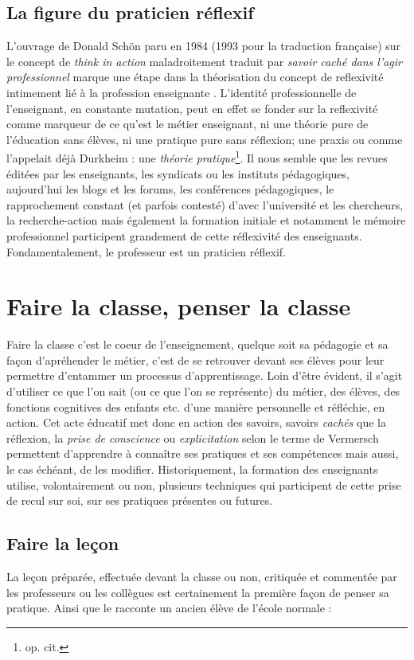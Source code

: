 \documentclass[a4paper,11pt]{article}
\begin{document}
			\subsection{La figure du praticien réflexif}
			L'ouvrage de Donald Schön paru en 1984 (1993 pour la traduction française) sur le concept de \emph{think in action} maladroitement traduit par \emph{savoir caché dans l'agir professionnel} marque une étape dans la théorisation du concept de reflexivité intimement lié à la profession enseignante \cite{sch93}. L'identité professionnelle de l'enseignant, en constante mutation, peut en effet se fonder sur la reflexivité comme marqueur de ce qu'est le métier enseignant, ni une théorie pure de l'éducation sans élèves, ni une pratique pure sans réflexion; une praxis ou comme l'appelait déjà Durkheim : une \emph{théorie pratique}\footnote{op. cit.}. Il nous semble que les revues éditées par les enseignants, les syndicats ou les instituts pédagogiques, aujourd'hui les blogs et les forums, les conférences pédagogiques, le rapprochement constant (et parfois contesté) d'avec l'université et les chercheurs, la recherche-action mais également la formation initiale et notamment le mémoire professionnel participent grandement de cette réflexivité des enseignants. Fondamentalement, le professeur est un praticien réflexif. 
			
\section{Faire la classe, penser la classe}
Faire la classe c'est le coeur de l'enseignement, quelque soit sa pédagogie et sa façon d'apréhender le métier, c'est de se retrouver devant ses élèves pour leur permettre d'entammer un processus d'apprentissage. Loin d'être évident, il s'agit d'utiliser ce que l'on sait (ou ce que l'on se représente) du métier, des élèves, des fonctions cognitives des enfants etc. d'une manière personnelle et réfléchie, en action. Cet acte éducatif met donc en action des savoirs, savoirs \emph{cachés} que la réflexion, la \emph{prise de conscience} ou \emph{explicitation} selon le terme de Vermersch \cite{ver94} permettent d'apprendre à connaître ses pratiques et ses compétences mais aussi, le cas échéant, de les modifier. Historiquement, la formation des enseignants utilise, volontairement ou non, plusieurs techniques qui participent de cette prise de recul sur soi, sur ses pratiques présentes ou futures.

			\subsection{Faire la leçon}
			La leçon préparée, effectuée devant la classe ou non, critiquée et commentée par les professeurs ou les collègues est certainement la première façon de penser sa pratique. Ainsi que le racconte un ancien élève de l'école normale :			
			
\end{document}
